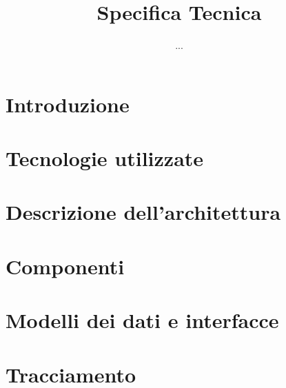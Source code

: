 


\author{...}
\dest{\ALL}
\title{Specifica Tecnica}


\maketitle

\tableofcontents
\listofpattern
\newpage



\section{Introduzione}


\section{Tecnologie utilizzate}


\section{Descrizione dell'architettura}


\section{Componenti}


\section{Modelli dei dati e interfacce}


\section{Tracciamento}





